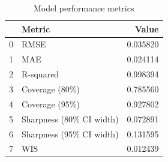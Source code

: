 \begin{table}[htbp]
\caption{Model performance metrics}
\label{tab:metrics_summary}
\begin{tabular}{llr}
\toprule
 & Metric & Value \\
\midrule
0 & RMSE & 0.035820 \\
1 & MAE & 0.024114 \\
2 & R-squared & 0.998394 \\
3 & Coverage (80\%) & 0.785560 \\
4 & Coverage (95\%) & 0.927802 \\
5 & Sharpness (80\% CI width) & 0.072891 \\
6 & Sharpness (95\% CI width) & 0.131595 \\
7 & WIS & 0.012439 \\
\bottomrule
\end{tabular}
\end{table}
